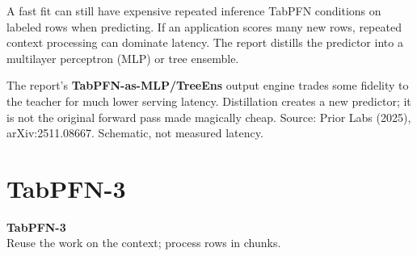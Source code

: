 \documentclass[aspectratio=169]{beamer}
\begin{document}
\begin{frame}{A fast fit can still have expensive repeated inference}
  \small
  TabPFN conditions on labeled rows when predicting. If an application scores many new rows,
  repeated context processing can dominate latency.
  The report distills the predictor into a multilayer perceptron (MLP) or tree ensemble.
  \vskip 9pt
  \begin{center}
  \end{center}
  \vskip 7pt
  The report's \textbf{TabPFN-as-MLP/TreeEns} output engine trades some fidelity to
  the teacher for much lower serving latency. Distillation creates a new predictor;
  it is not the original forward pass made magically cheap.
  \vskip 4pt
  {\scriptsize Source: Prior Labs (2025), arXiv:2511.08667. Schematic, not measured latency.}
\end{frame}

\section{TabPFN-3}
\begin{frame}[plain]
  \vfill\centering
  {\Large\color{popblue}\textbf{TabPFN-3}}\\[9pt]
  {\small Reuse the work on the context; process rows in chunks.}
  \vfill
\end{frame}
\end{document}
